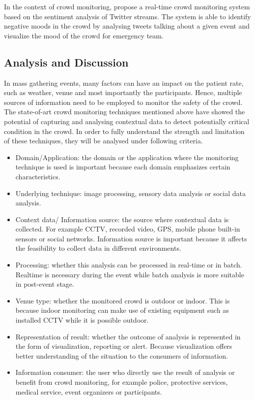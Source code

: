 In the context of crowd monitoring, \citet{DelirHaghighi2013} propose a real-time crowd monitoring system based on the sentiment analysis of Twitter streams. The system is able to identify negative moods in the crowd by analysing tweets talking about a given event and visualize the mood of the crowd for emergency team.

\subsection{Analysis and Discussion}
In mass gathering events, many factors can have an impact on the patient rate, such as weather, venue and most importantly the participants. Hence, multiple sources of information need to be employed to monitor the safety of the crowd. The state-of-art crowd monitoring techniques mentioned above have showed the potential of capturing and analysing contextual data to detect potentially critical condition in the crowd. In order to fully understand the strength and limitation of these techniques, they will be analysed under following criteria.

\begin{itemize}
	\item Domain/Application: the domain or the application where the monitoring technique is used is important because each domain emphasizes certain characteristics. 
	\item Underlying technique: image processing, sensory data analysis or social data analysis.
	\item Context data/ Information source: the source where contextual data is collected. For example CCTV, recorded video, GPS, mobile phone built-in sensors or social networks. Information source is important because it affects the feasibility to collect data in different environments.
	\item Processing: whether this analysis can be processed in real-time or in batch. Realtime is necessary during the event while batch analysis is more suitable in post-event stage.
	\item Venue type: whether the monitored crowd is outdoor or indoor. This is because indoor monitoring can make use of existing equipment such as installed CCTV while it is possible outdoor.
	\item Representation of result: whether the outcome of analysis is represented in the form of visualization, reporting or alert. Because visualization offers better understanding of the situation to the consumers of information.
	\item Information consumer: the user who directly use the result of analysis or benefit from crowd monitoring, for example police, protective services, medical service, event organizers or participants.
\end{itemize}


